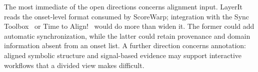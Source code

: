 \documentclass{article}
\begin{document}
The most immediate of the open directions concerns alignment input. LayerIt reads the onset-level format consumed by ScoreWarp; integration with the Sync Toolbox~\cite{muller2021SyncToolboxPython} or Time to Align!~\cite{hentschel2026TimeAlignModelling} would do more than widen it. The former could add automatic synchronization, while the latter could retain provenance and domain information absent from an onset list. A further direction concerns annotation: aligned symbolic structure and signal-based evidence may support interactive workflows that a divided view makes difficult.






\end{document}
